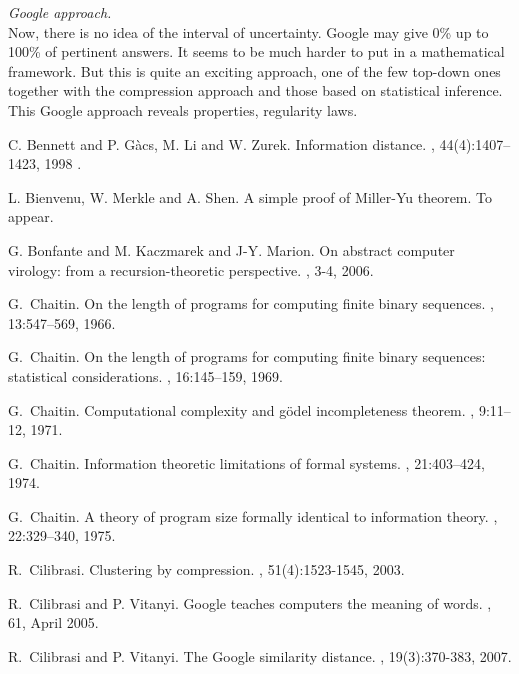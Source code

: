 {\em Google approach.}\\
Now, there is no idea of the interval of uncertainty.
Google may give 0\% up to 100\% of pertinent answers.
It seems to be much harder to put in a mathematical framework.
But this is quite an exciting approach, one of the few
top-down ones together with the compression approach and
those based on statistical inference.
This Google approach reveals properties, regularity laws.
\begin{thebibliography}{9}  

C. Bennett and P. G\`acs, M. Li and W. Zurek.
\newblock Information distance.
,
44(4):1407--1423, 1998 .

L. Bienvenu, W. Merkle and A. Shen.
\newblock A simple proof of Miller-Yu theorem.
\newblock To appear.

G. Bonfante and M. Kaczmarek and J-Y. Marion.
\newblock On abstract computer virology: from a recursion-theoretic perspective.
, 3-4, 2006.

G.~Chaitin.
\newblock On the length of programs for computing finite binary
sequences.
, 13:547--569, 1966.

G.~Chaitin.
\newblock On the length of programs for computing finite binary
sequences: statistical considerations.
, 16:145--159, 1969.

G.~Chaitin.
\newblock Computational complexity and g{\"o}del incompleteness theorem.
, 9:11--12, 1971.

G.~Chaitin.
\newblock Information theoretic limitations of formal systems.
, 21:403--424, 1974.

G.~Chaitin.
\newblock A theory of program size formally identical
to information theory.
, 22:329--340, 1975.

R.~Cilibrasi.
\newblock Clustering by compression.
,
51(4):1523-1545, 2003.

R.~Cilibrasi and P. Vitanyi.
\newblock Google teaches computers the meaning of words.
, 61, April 2005.

R.~Cilibrasi and P. Vitanyi.
\newblock The Google similarity distance.
,
19(3):370-383, 2007.


\end{thebibliography}
